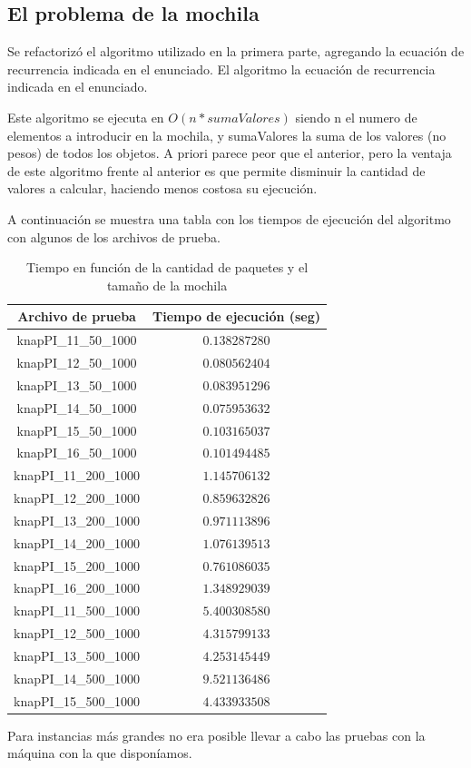 \documentclass[a4paper,10pt]{article}
\begin{document}
\subsection{El problema de la mochila}

Se refactorizó el algoritmo utilizado en la primera parte, agregando la ecuación de recurrencia indicada en el enunciado. El algoritmo la ecuación de recurrencia indicada en el enunciado.

Este algoritmo se ejecuta en $O(n * sumaValores)$ siendo n el numero de elementos a introducir en la mochila, y sumaValores la suma de los valores (no pesos) de todos los objetos. A priori parece peor que el anterior, pero la ventaja de este algoritmo frente al anterior es que permite disminuir la cantidad de valores a calcular, haciendo menos costosa su ejecución.

A continuación se muestra una tabla con los tiempos de ejecución del algoritmo con algunos de los archivos de prueba.

\begin{table}[H]
\centering
\begin{tabular}{|c|c|}
\hline
Archivo de prueba	& Tiempo de ejecución (seg)\\\hline
knapPI\_11\_50\_1000	& $0.138287280$ \\\hline
knapPI\_12\_50\_1000	& $0.080562404$ \\\hline
knapPI\_13\_50\_1000	& $0.083951296$ \\\hline
knapPI\_14\_50\_1000	& $0.075953632$ \\\hline
knapPI\_15\_50\_1000	& $0.103165037$ \\\hline
knapPI\_16\_50\_1000	& $0.101494485$ \\\hline
knapPI\_11\_200\_1000	& $1.145706132$ \\\hline
knapPI\_12\_200\_1000	& $0.859632826$ \\\hline
knapPI\_13\_200\_1000	& $0.971113896$ \\\hline
knapPI\_14\_200\_1000	& $1.076139513$ \\\hline
knapPI\_15\_200\_1000	& $0.761086035$ \\\hline
knapPI\_16\_200\_1000	& $1.348929039$ \\\hline 
knapPI\_11\_500\_1000	& $5.400308580$ \\\hline 
knapPI\_12\_500\_1000	& $4.315799133$ \\\hline 
knapPI\_13\_500\_1000	& $4.253145449$ \\\hline 
knapPI\_14\_500\_1000	& $9.521136486$ \\\hline 
knapPI\_15\_500\_1000	& $4.433933508$ \\\hline 
\end{tabular}
\caption{Tiempo en función de la cantidad de paquetes y el tamaño de la mochila}
\label{tab:held}
\end{table}

Para instancias más grandes no era posible llevar a cabo las pruebas con la máquina con la que disponíamos.
\end{document}

